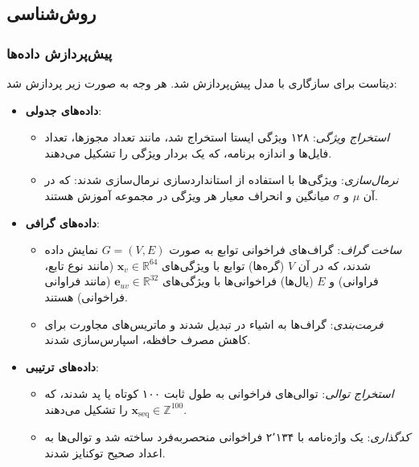 \subsection{روش‌شناسی}

\subsubsection{پیش‌پردازش داده‌ها}
دیتاست  برای سازگاری با مدل  پیش‌پردازش شد. هر وجه به صورت زیر پردازش شد:

\begin{itemize}
    \renewcommand{\labelitemi}{\lr{$\bullet$}}
    \item \textbf{داده‌های جدولی}:
        \begin{itemize}
            \renewcommand{\labelitemii}{\lr{$\bullet$}}
            \item \textit{استخراج ویژگی}: ۱۲۸ ویژگی ایستا استخراج شد، مانند تعداد مجوزها، تعداد فایل‌ها و اندازه برنامه، که یک بردار ویژگی  را تشکیل می‌دهند.
            \item \textit{نرمال‌سازی}: ویژگی‌ها با استفاده از استانداردسازی نرمال‌سازی شدند:
            \lr{\[
            x_{\text{norm}} = \frac{x - \mu}{\sigma},
            \]}
            که در آن \( \mu \) و \( \sigma \) میانگین و انحراف معیار هر ویژگی در مجموعه آموزش هستند.
        \end{itemize}
    \item \textbf{داده‌های گرافی}:
        \begin{itemize}
            \renewcommand{\labelitemii}{\lr{$\bullet$}}
            \item \textit{ساخت گراف}: گراف‌های فراخوانی توابع به صورت \( G = (V, E) \) نمایش داده شدند، که در آن \( V \) (گره‌ها) توابع با ویژگی‌های \( \mathbf{x}_v \in \mathbb{R}^{64} \) (مانند نوع تابع، فراوانی) و \( E \) (یال‌ها) فراخوانی‌ها با ویژگی‌های \( \mathbf{e}_{uv} \in \mathbb{R}^{32} \) (مانند فراوانی فراخوانی) هستند.
            \item \textit{فرمت‌بندی}: گراف‌ها به اشیاء  در  تبدیل شدند و ماتریس‌های مجاورت برای کاهش مصرف حافظه، اسپارس‌سازی شدند.
        \end{itemize}
    \item \textbf{داده‌های ترتیبی}:
        \begin{itemize}
            \renewcommand{\labelitemii}{\lr{$\bullet$}}
            \item \textit{استخراج توالی}: توالی‌های فراخوانی  به طول ثابت ۱۰۰ کوتاه یا پد شدند، که \( \mathbf{x}_{\text{seq}} \in \mathbb{Z}^{100} \) را تشکیل می‌دهند.
            \item \textit{کدگذاری}: یک واژه‌نامه با ۲٬۱۳۴ فراخوانی  منحصربه‌فرد ساخته شد و توالی‌ها به اعداد صحیح توکنایز شدند.
        \end{itemize}
\end{itemize}


